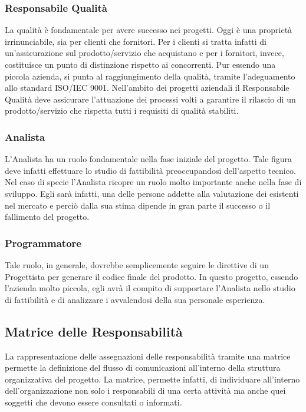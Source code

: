 \subsubsection{Responsabile Qualità}	
	La qualità è fondamentale per avere successo nei progetti. Oggi è una proprietà irrinunciabile, sia per clienti che fornitori. Per i clienti si tratta infatti di un'assicurazione sul prodotto/servizio che acquistano e per i fornitori, invece, costituisce  un punto di distinzione rispetto ai concorrenti.
Pur essendo una piccola azienda, si punta al raggiungimento della qualità, tramite l'adeguamento allo standard ISO/IEC 9001.
Nell'ambito dei progetti aziendali il Responsabile Qualità deve assicurare l'attuazione dei processi volti a garantire il rilascio di un prodotto/servizio che rispetta tutti i requisiti di qualità stabiliti.
	 
\subsubsection{Analista}
	L'Analista ha un ruolo fondamentale nella fase iniziale del progetto. Tale figura deve infatti effettuare lo studio di fattibilità preoccupandosi dell'aspetto tecnico. Nel caso di specie l'Analista ricopre un ruolo molto importante anche nella fase di sviluppo. Egli sarà infatti, una delle persone addette alla valutazione dei  esistenti nel mercato e perciò  dalla sua stima dipende in gran parte il successo o il fallimento del progetto.

\subsubsection{Programmatore}
	 Tale ruolo, in generale, dovrebbe semplicemente seguire le direttive di un Progettista per generare il codice finale del prodotto. In questo progetto, essendo l'azienda molto piccola, egli avrà il compito di supportare l'Analista nello studio di fattibilità e di analizzare i  avvalendosi della sua personale esperienza.




\subsection{Matrice delle Responsabilità}
La rappresentazione delle assegnazioni delle responsabilità tramite una matrice permette la definizione del flusso di comunicazioni all'interno della struttura organizzativa del progetto. La matrice, permette infatti, di individuare all'interno dell'organizzazione non solo i responsabili di una certa attività ma anche quei soggetti che devono essere consultati o informati.

